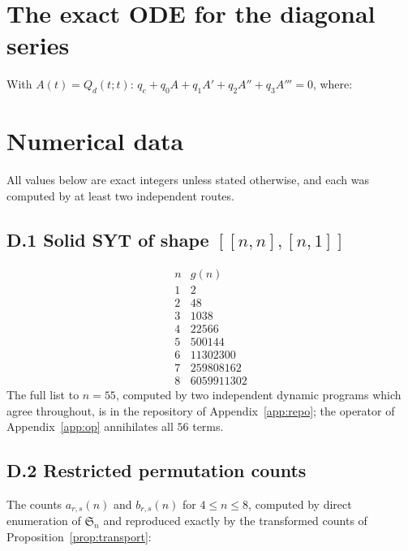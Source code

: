\documentclass[11pt]{article}
\theoremstyle{definition}
\begin{document}
\section{The exact ODE for the diagonal series}\label{app:ode}
With $A(t)=Q_d(t;t)$: $q_c+q_0A+q_1A'+q_2A''+q_3A'''=0$, where:


\section{Numerical data}\label{app:data}

All values below are exact integers unless stated otherwise, and each was
computed by at least two independent routes.

\subsection*{D.1 Solid SYT of shape $[[n,n],[n,1]]$}

\[
\begin{array}{rl}
n & g(n)\\\hline
1 & 2\\
2 & 48\\
3 & 1038\\
4 & 22566\\
5 & 500144\\
6 & 11302300\\
7 & 259808162\\
8 & 6059911302
\end{array}
\]
The full list to $n=55$, computed by two independent dynamic programs which
agree throughout, is in the repository of Appendix~\ref{app:repo}; the operator
of Appendix~\ref{app:op} annihilates all $56$ terms.

\subsection*{D.2 Restricted permutation counts}

The counts $a_{r,s}(n)$ and $b_{r,s}(n)$ for $4\le n\le8$, computed by direct
enumeration of $\mathfrak S_n$ and reproduced exactly by the transformed counts
of Proposition~\ref{prop:transport}:
\end{document}
